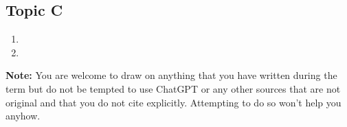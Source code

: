 \documentclass[12pt,letterpaper]{article}
\begin{document}
\subsection*{Topic C}

\begin{enumerate}
  \item 
    \answer{
    }
  \item 
    \answer{
    }
\end{enumerate}

\vspace{.2in}
\noindent
\textbf{Note:} You are welcome to draw on anything that you have written during the term but do not be tempted to use ChatGPT or any other sources that are not original and that you do not cite explicitly.
Attempting to do so won't help you anyhow.
\end{document}
